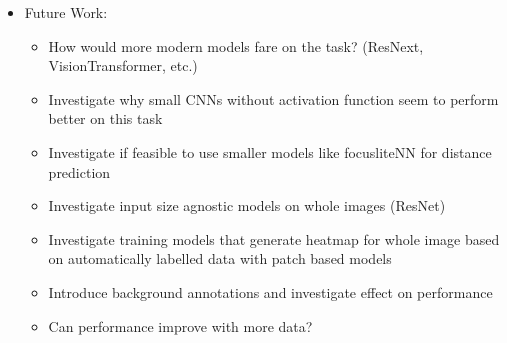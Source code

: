 \begin{itemize}
    \item Future Work:
    \begin{itemize}
        \item How would more modern models fare on the task? (ResNext, VisionTransformer, etc.)
        \item Investigate why small CNNs without activation function seem to perform better on this task
        \item Investigate if feasible to use smaller models like focusliteNN for distance prediction
        \item Investigate input size agnostic models on whole images (ResNet)
        \item Investigate training models that generate heatmap for whole image based on automatically labelled data with patch based models
        \item Introduce background annotations and investigate effect on performance
        \item Can performance improve with more data?
    \end{itemize}
\end{itemize}
